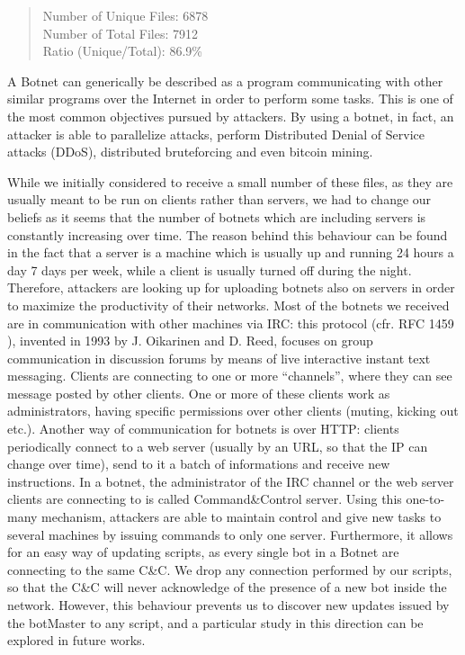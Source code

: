 \begin{quote}
Number of Unique Files: 6878\\
Number of Total Files: 7912\\
Ratio (Unique/Total): 86.9\%
\end{quote}

A Botnet can generically be described as a program communicating with other similar programs over the Internet in order to perform some tasks. This is one of the most common objectives pursued by attackers. By using a botnet, in fact, an attacker is able to parallelize attacks, perform Distributed Denial of Service attacks (DDoS), distributed bruteforcing and even bitcoin mining.

While we initially considered to receive a small number of these files, as they are usually meant to be run on clients rather than servers, we had to change our beliefs as it seems that the number of botnets which are including servers is constantly increasing over time. The reason behind this behaviour can be found in the fact that a server is a machine which is usually up and running 24 hours a day 7 days per week, while a client is usually turned off during the night. Therefore, attackers are looking up for uploading botnets also on servers in order to maximize the productivity of their networks.
Most of the botnets we received are in communication with other machines via IRC: this protocol (cfr. RFC 1459 \cite{irc}), invented in 1993 by J. Oikarinen and D. Reed, focuses on group communication in discussion forums by means of live interactive instant text messaging. Clients are connecting to one or more ``channels'', where they can see message posted by other clients. One or more of these clients work as administrators, having specific permissions over other clients (muting, kicking out etc.).
Another way of communication for botnets is over HTTP: clients periodically connect to a web server (usually by an URL, so that the IP can change over time), send to it a batch of informations and receive new instructions.
In a botnet, the administrator of the IRC channel or the web server clients are connecting to is called Command\&Control server. Using this one-to-many mechanism, attackers are able to maintain control and give new tasks to several machines by issuing commands to only one server. Furthermore, it allows for an easy way of updating scripts, as every single bot in a Botnet are connecting to the same C\&C. We drop any connection performed by our scripts, so that the C\&C will never acknowledge of the presence of a new bot inside the network. However, this behaviour prevents us to discover new updates issued by the botMaster to any script, and a particular study in this direction can be explored in future works.

